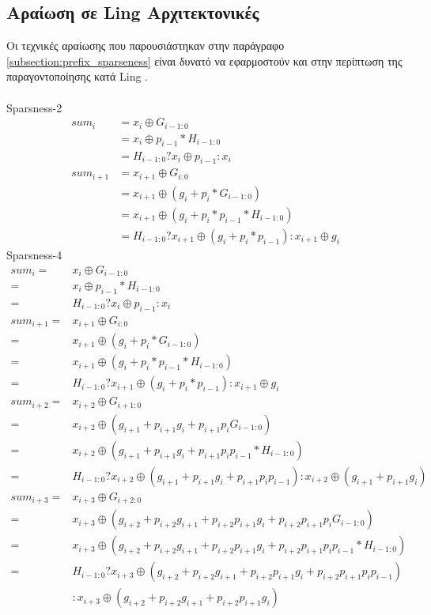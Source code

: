 \subsection{Αραίωση σε Ling Αρχιτεκτονικές}
Οι τεχνικές αραίωσης που παρουσιάστηκαν στην παράγραφο \ref{subsection:prefix_sparseness}
 είναι δυνατό να εφαρμοστούν και στην περίπτωση της παραγοντοποίησης κατά
 Ling \cite{1377160}.\\\\   
Sparsness-2
\begin{equation*}
    \begin{split}
        sum_i &= x_i \oplus G_{i-1:0}\\
              &= x_i \oplus p_{i-1}*H_{i-1:0}\\
              &= H_{i-1:0} ? x_i \oplus p_{i-1} : x_i\\
        sum_{i+1} &= x_{i+1} \oplus G_{i:0}\\
                  &= x_{i+1} \oplus (g_i + p_i*G_{i-1:0})\\
                  &= x_{i+1} \oplus (g_i + p_i*p_{i-1}*H_{i-1:0})\\
                  &= H_{i-1:0} ? x_{i+1} \oplus (g_i + p_i*p_{i-1}) : x_{i+1} \oplus g_i
    \end{split} 
\end{equation*}
Sparsness-4
\begin{equation*}
    \begin{split}
        sum_i =& x_i \oplus G_{i-1:0}\\
        =& x_i \oplus p_{i-1}*H_{i-1:0}\\
        =& H_{i-1:0} ? x_i \oplus p_{i-1} : x_i\\
        sum_{i+1} =& x_{i+1} \oplus G_{i:0}\\
        =& x_{i+1} \oplus (g_i + p_i*G_{i-1:0})\\
        =& x_{i+1} \oplus (g_i + p_i*p_{i-1}*H_{i-1:0})\\
        =& H_{i-1:0} ? x_{i+1} \oplus (g_i + p_i*p_{i-1}) : x_{i+1} \oplus g_i\\
        sum_{i+2} =& x_{i+2} \oplus G_{i+1:0}\\
        =& x_{i+2} \oplus (g_{i+1} + p_{i+1}g_i + p_{i+1}p_iG_{i-1:0})\\
        =& x_{i+2} \oplus (g_{i+1} + p_{i+1}g_i + p_{i+1}p_ip_{i-1}*H_{i-1:0})\\
        =& H_{i-1:0} ? x_{i+2} \oplus (g_{i+1} + p_{i+1}g_i + p_{i+1}p_ip_{i-1}) : x_{i+2} \oplus (g_{i+1} + p_{i+1}g_i)\\
        sum_{i+3} =& x_{i+3} \oplus G_{i+2:0}\\
        =& x_{i+3} \oplus (g_{i+2} + p_{i+2}g_{i+1} + p_{i+2}p_{i+1}g_i + p_{i+2}p_{i+1}p_iG_{i-1:0})\\
        =& x_{i+3} \oplus (g_{i+2} + p_{i+2}g_{i+1} + p_{i+2}p_{i+1}g_i + p_{i+2}p_{i+1}p_ip_{i-1}*H_{i-1:0})\\
        =& H_{i-1:0} ? x_{i+3} \oplus (g_{i+2} + p_{i+2}g_{i+1} + p_{i+2}p_{i+1}g_i + p_{i+2}p_{i+1}p_ip_{i-1}) \\&: x_{i+3} \oplus (g_{i+2} + p_{i+2}g_{i+1} + p_{i+2}p_{i+1}g_i)
    \end{split} 
\end{equation*}

 
 